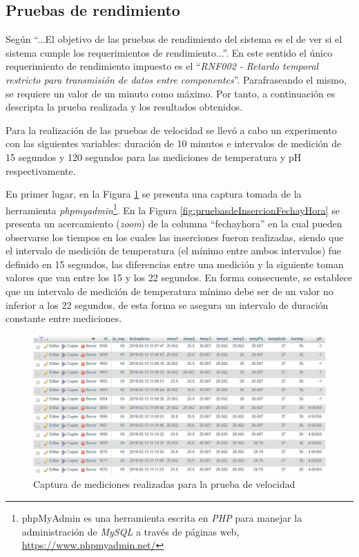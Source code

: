 \subsection{Pruebas de rendimiento}
\par Según \cite{PracticalSoftwareTesting} ``...El objetivo de las pruebas de rendimiento del sistema es el de ver si el sistema cumple los requerimientos de rendimiento...''. En este sentido el único requerimiento de rendimiento impuesto es el ``\textit{RNF002 - Retardo temporal restricto para transmisión de datos entre componentes}''. Parafraseando el mismo, se requiere un valor de un minuto como máximo. Por tanto, a continuación es descripta la prueba realizada y los resultados obtenidos.
\par
Para la realización de las pruebas de velocidad se llevó a cabo un experimento con las siguientes variables: duración de 10 minutos e intervalos de medición de 15 segundos y 120 segundos para las mediciones de temperatura y pH respectivamente.
\par 
En primer lugar, en la Figura \ref{fig:pruebasdeInsercion} se presenta una captura tomada de la herramienta \textit{phpmyadmin}\footnote{phpMyAdmin es una herramienta escrita en \textit{PHP} para manejar la administración de \textit{MySQL} a través de páginas web, \url{https://www.phpmyadmin.net/}}. En la Figura \ref{fig:pruebasdeInsercionFechayHora} se presenta un acercamiento (\textit{zoom}) de la columna ``fechayhora'' en la cual  pueden observarse los tiempos en los cuales las inserciones fueron realizadas, siendo que el intervalo de medición de temperatura (el mínimo entre ambos intervalos) fue definido en 15 segundos, las diferencias entre una medición y la siguiente toman valores que van entre los 15 y los 22 segundos. En forma consecuente, se establece que un intervalo de medición de temperatura mínimo debe ser de un valor no inferior a los 22 segundos, de esta forma se asegura un intervalo de duración constante entre mediciones.
\begin{figure}[H]
    \centering
    \includegraphics[scale=0.5]{Pruebas/Inserciones.jpg}
    \caption{Captura de mediciones realizadas para la prueba de velocidad}
    \label{fig:pruebasdeInsercion}
\end{figure}
